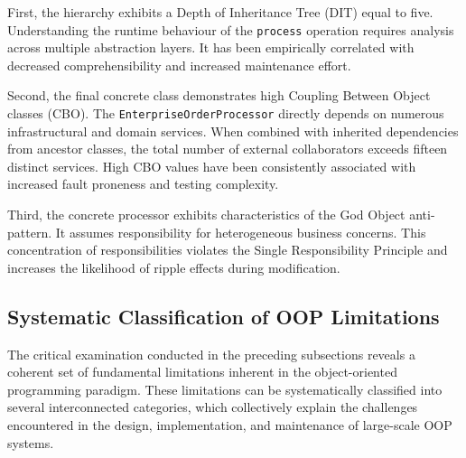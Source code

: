First, the hierarchy exhibits a Depth of Inheritance Tree (DIT) equal to five. Understanding the runtime behaviour of the \texttt{process} operation requires analysis across multiple abstraction layers. It has been empirically correlated with decreased comprehensibility and increased maintenance effort.

Second, the final concrete class demonstrates high Coupling Between Object classes (CBO). The \texttt{EnterpriseOrderProcessor} directly depends on numerous infrastructural and domain services. When combined with inherited dependencies from ancestor classes, the total number of external collaborators exceeds fifteen distinct services. High CBO values have been consistently associated with increased fault proneness and testing complexity.

Third, the concrete processor exhibits characteristics of the God Object anti-pattern. It assumes responsibility for heterogeneous business concerns. This concentration of responsibilities violates the Single Responsibility Principle and increases the likelihood of ripple effects during modification.

\subsection{Systematic Classification of OOP Limitations}

The critical examination conducted in the preceding subsections reveals a coherent set of fundamental limitations inherent in the object-oriented programming paradigm. These limitations can be systematically classified into several interconnected categories, which collectively explain the challenges encountered in the design, implementation, and maintenance of large-scale OOP systems.

